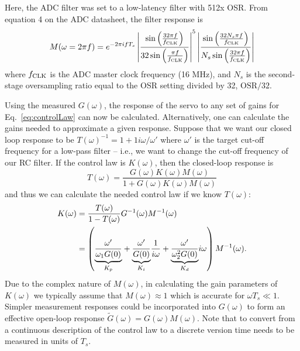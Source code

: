 \documentclass{article}
\begin{document}
Here, the ADC filter was set to a low-latency filter with 512x OSR.  From equation 4 on the ADC datasheet, the filter response is
\begin{equation}
M(\omega=2\pi f) = e^{-2\pi i f T_s} \left|\frac{\sin\left(\frac{32\pi f}{f_{\rm CLK}}\right)}{32\sin\left(\frac{\pi f}{f_{\rm CLK}}\right)}\right|^5 \left|\frac{\sin\left(\frac{32 N_s\pi f}{f_{\rm CLK}}\right)}{N_s\sin\left(\frac{32\pi f}{f_{\rm CLK}}\right)}\right|
\label{eq:MeasurementResponse}
\end{equation}
where $f_{\rm CLK}$ is the ADC master clock frequency (16 MHz), and $N_s$ is the second-stage oversampling ratio equal to the OSR setting divided by 32, $\mathrm{OSR}/32$.

Using the measured $G(\omega)$, the response of the servo to any set of gains for Eq.~\eqref{eq:controlLaw} can now be calculated.  Alternatively, one can calculate the gains needed to approximate a given response.  Suppose that we want our closed loop response to be $T(\omega) ^{-1} = 1+1i\omega/\omega'$ where $\omega'$ is the target cut-off frequency for a low-pass filter -- i.e., we want to change the cut-off frequency of our RC filter.  If the control law is $K(\omega)$, then the closed-loop response is
\begin{equation}
	T(\omega) = \frac{G(\omega)K(\omega)M(\omega)}{1+G(\omega)K(\omega)M(\omega)}
	\label{eq:closedLoopResponse}
\end{equation}
and thus we can calculate the needed control law if we know $T(\omega)$:
\begin{align}
	K(\omega) &= \frac{T(\omega)}{1-T(\omega)}G^{-1}(\omega)M^{-1}(\omega)\notag\\
	&= \left(\underset{K_p}{\underbrace{\frac{\omega'}{\omega_1 G(0)}}} + \underset{K_i}{\underbrace{\frac{\omega'}{G(0)}}}\frac{1}{i\omega} + \underset{K_d}{\underbrace{\frac{\omega'}{\omega_2^2G(0)}}}i\omega\right)M^{-1}(\omega).
	\label{eq:loopShaping}
\end{align}
Due to the complex nature of $M(\omega)$, in calculating the gain parameters of $K(\omega)$ we typically assume that $M(\omega)\approx 1$ which is accurate for $\omega T_s\ll 1$.  Simpler measurement responses could be incorporated into $G(\omega)$ to form an effective open-loop response $\tilde{G}(\omega) = G(\omega)M(\omega)$.  Note that to convert from a continuous description of the control law to a discrete version time needs to be measured in units of $T_s$.
\end{document}
